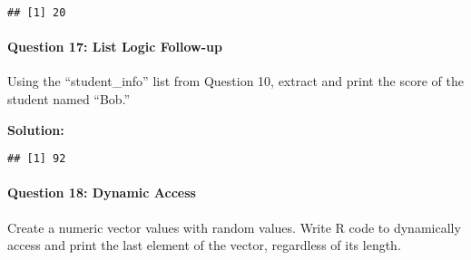 \documentclass[
]{article}
\newenvironment{Shaded}{\begin{snugshade}}{\end{snugshade}}
\newcommand{\AttributeTok}[1]{\textcolor[rgb]{0.13,0.29,0.53}{#1}}
\newcommand{\CommentTok}[1]{\textcolor[rgb]{0.56,0.35,0.01}{\textit{#1}}}
\newcommand{\ConstantTok}[1]{\textcolor[rgb]{0.56,0.35,0.01}{#1}}
\newcommand{\DecValTok}[1]{\textcolor[rgb]{0.00,0.00,0.81}{#1}}
\newcommand{\FunctionTok}[1]{\textcolor[rgb]{0.13,0.29,0.53}{\textbf{#1}}}
\newcommand{\NormalTok}[1]{#1}
\newcommand{\OtherTok}[1]{\textcolor[rgb]{0.56,0.35,0.01}{#1}}
\newcommand{\SpecialCharTok}[1]{\textcolor[rgb]{0.81,0.36,0.00}{\textbf{#1}}}
\newcommand{\StringTok}[1]{\textcolor[rgb]{0.31,0.60,0.02}{#1}}
\begin{document}
\begin{verbatim}
## [1] 20
\end{verbatim}

\hypertarget{question-17-list-logic-follow-up}{%
\paragraph{Question 17: List Logic
Follow-up}\label{question-17-list-logic-follow-up}}

Using the ``student\_info'' list from Question 10, extract and print the
score of the student named ``Bob.''

\textbf{Solution:}

\begin{Shaded}
\end{Shaded}

\begin{verbatim}
## [1] 92
\end{verbatim}

\hypertarget{question-18-dynamic-access}{%
\paragraph{Question 18: Dynamic
Access}\label{question-18-dynamic-access}}

Create a numeric vector values with random values. Write R code to
dynamically access and print the last element of the vector, regardless
of its length.
\end{document}
